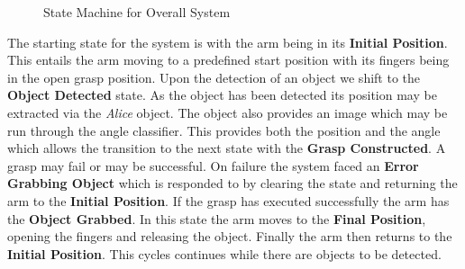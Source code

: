 \documentclass[letterpaper, 10 pt, conference]{conf/ieeeconf}  %
\begin{document}
\begin{figure}[h]
  \centering
  \caption{\label{fig:1}State Machine for Overall System}
\end{figure}
\newpage
The starting state for the system is with the arm being in its \textbf{Initial
  Position}. This entails the arm moving to a predefined start position with its
fingers being in the open grasp position. Upon the detection of an object we
shift to the \textbf{Object Detected} state. As the object has been detected its
position may be extracted via the \textit{Alice} object. The object also
provides an image which may be run through the angle classifier. This provides
both the position and the angle which allows the transition to the next state
with the \textbf{Grasp Constructed}. A grasp may fail or may be successful. On
failure the system faced an \textbf{Error Grabbing Object} which is responded to
by clearing the state and returning the arm to the \textbf{Initial Position}. If
the grasp has executed successfully the arm has the \textbf{Object Grabbed}. In
this state the arm moves to the \textbf{Final Position}, opening the fingers and
releasing the object. Finally the arm then returns to the \textbf{Initial
  Position}. This cycles continues while there are objects to be detected.
\end{document}
